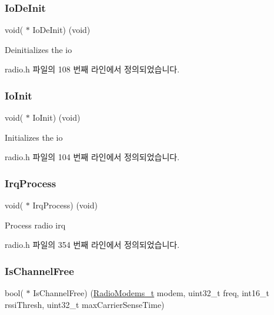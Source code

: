 \subsubsection{\texorpdfstring{Io\+De\+Init}{IoDeInit}}
{\footnotesize\ttfamily void( $\ast$ Io\+De\+Init) (void)}



Deinitializes the io 



radio.\+h 파일의 108 번째 라인에서 정의되었습니다.

\mbox{\label{struct_radio__s_a83cf0df693579d453bad2d5b7d5565ed}} 
\subsubsection{\texorpdfstring{Io\+Init}{IoInit}}
{\footnotesize\ttfamily void( $\ast$ Io\+Init) (void)}



Initializes the io 



radio.\+h 파일의 104 번째 라인에서 정의되었습니다.

\mbox{\label{struct_radio__s_ae5865dd1b58fc4f6d086f2de5c993c02}} 
\subsubsection{\texorpdfstring{Irq\+Process}{IrqProcess}}
{\footnotesize\ttfamily void( $\ast$ Irq\+Process) (void)}



Process radio irq 



radio.\+h 파일의 354 번째 라인에서 정의되었습니다.

\mbox{\label{struct_radio__s_a4c8c593c3c380636ec2ca7c452d59281}} 
\subsubsection{\texorpdfstring{Is\+Channel\+Free}{IsChannelFree}}
{\footnotesize\ttfamily bool( $\ast$ Is\+Channel\+Free) (\mbox{\hyperlink{radio_8h_a992ef7a5b7f52975ba7bd8dd97740057}{Radio\+Modems\+\_\+t}} modem, uint32\+\_\+t freq, int16\+\_\+t rssi\+Thresh, uint32\+\_\+t max\+Carrier\+Sense\+Time)}



